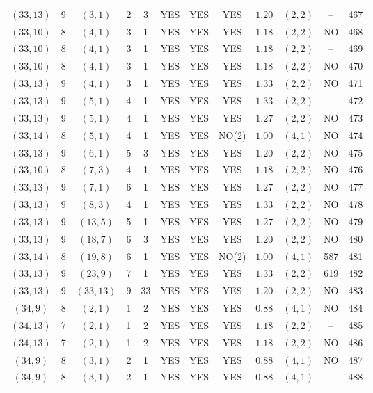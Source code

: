 \begin{longtable}{|c|c|c|c|c|c|c|c|c|c|c|c|}
$(33,13)$ & 9 & $(3,1)$ & 2 & 3 & YES & YES & YES & $1.20$ & $(2,2)$ & -- & 467\\
$(33,10)$ & 8 & $(4,1)$ & 3 & 1 & YES & YES & YES & $1.18$ & $(2,2)$ & NO & 468\\
$(33,10)$ & 8 & $(4,1)$ & 3 & 1 & YES & YES & YES & $1.18$ & $(2,2)$ & -- & 469\\
$(33,10)$ & 8 & $(4,1)$ & 3 & 1 & YES & YES & YES & $1.18$ & $(2,2)$ & NO & 470\\
$(33,13)$ & 9 & $(4,1)$ & 3 & 1 & YES & YES & YES & $1.33$ & $(2,2)$ & NO & 471\\
$(33,13)$ & 9 & $(5,1)$ & 4 & 1 & YES & YES & YES & $1.33$ & $(2,2)$ & -- & 472\\
$(33,13)$ & 9 & $(5,1)$ & 4 & 1 & YES & YES & YES & $1.27$ & $(2,2)$ & NO & 473\\
$(33,14)$ & 8 & $(5,1)$ & 4 & 1 & YES & YES & NO(2) & $1.00$ & $(4,1)$ & NO & 474\\
$(33,13)$ & 9 & $(6,1)$ & 5 & 3 & YES & YES & YES & $1.20$ & $(2,2)$ & NO & 475\\
$(33,10)$ & 8 & $(7,3)$ & 4 & 1 & YES & YES & YES & $1.18$ & $(2,2)$ & NO & 476\\
$(33,13)$ & 9 & $(7,1)$ & 6 & 1 & YES & YES & YES & $1.27$ & $(2,2)$ & NO & 477\\
$(33,13)$ & 9 & $(8,3)$ & 4 & 1 & YES & YES & YES & $1.33$ & $(2,2)$ & NO & 478\\
$(33,13)$ & 9 & $(13,5)$ & 5 & 1 & YES & YES & YES & $1.27$ & $(2,2)$ & NO & 479\\
$(33,13)$ & 9 & $(18,7)$ & 6 & 3 & YES & YES & YES & $1.20$ & $(2,2)$ & NO & 480\\
$(33,14)$ & 8 & $(19,8)$ & 6 & 1 & YES & YES & NO(2) & $1.00$ & $(4,1)$ & 587 & 481\\
$(33,13)$ & 9 & $(23,9)$ & 7 & 1 & YES & YES & YES & $1.33$ & $(2,2)$ & 619 & 482\\
$(33,13)$ & 9 & $(33,13)$ & 9 & 33 & YES & YES & YES & $1.20$ & $(2,2)$ & NO & 483\\
$(34,9)$ & 8 & $(2,1)$ & 1 & 2 & YES & YES & YES & $0.88$ & $(4,1)$ & NO & 484\\
$(34,13)$ & 7 & $(2,1)$ & 1 & 2 & YES & YES & YES & $1.18$ & $(2,2)$ & -- & 485\\
$(34,13)$ & 7 & $(2,1)$ & 1 & 2 & YES & YES & YES & $1.18$ & $(2,2)$ & NO & 486\\
$(34,9)$ & 8 & $(3,1)$ & 2 & 1 & YES & YES & YES & $0.88$ & $(4,1)$ & NO & 487\\
$(34,9)$ & 8 & $(3,1)$ & 2 & 1 & YES & YES & YES & $0.88$ & $(4,1)$ & -- & 488\\

\end{longtable}
